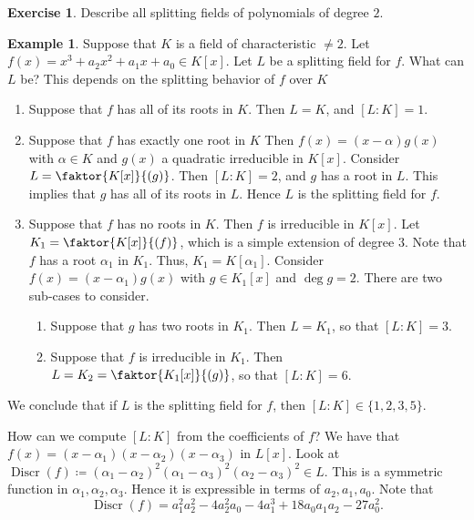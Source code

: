 \documentclass[10pt,letterpaper,cm]{nupset}
\theoremstyle{definition}
\newtheorem{exmp}[definition]{Example}
\theoremstyle{theorem}
\newtheorem{exercise}[definition]{Exercise}
\theoremstyle{remark}
\newcommand{\1}{\mathbf{1}}
\newcommand{\0}{\vec 0}
\DeclareMathOperator{\disc}{Discr}
\begin{document}
\begin{exercise}
Describe all splitting fields of polynomials of degree $2$.
\end{exercise}

\begin{exmp} 
Suppose that $K$ is a field of characteristic $\ne 2$. Let $f(x) = x^3 + a_2x^2 + a_1x + a_0 \in K[x]$. Let $L$ be a splitting field for $f$. What can $L$ be? This depends on the splitting behavior of $f$ over $K$
\begin{enumerate}[label=(\Alph*)]
\item Suppose that $f$ has all of its roots in $K$. Then $L = K$, and $[L:K]=1$.
\item Suppose that $f$ has exactly one root in $K$ Then $f(x) = (x-\alpha)g(x)$ with $\alpha \in K$ and $g(x)$ a quadratic irreducible in $K[x]$. Consider $L = \faktor{K[x]}{(g)}$. Then $[L: K]=2$, and $g$ has a root in $L$. This implies that $g$ has all of its roots in $L$. Hence $L$ is the splitting field for $f$. 
\item Suppose that $f$ has no roots in $K$. Then $f$ is irreducible in $K[x]$. Let $K_1 = \faktor{K[x]}{(f)}$, which is a simple extension of degree $3$. Note that $f$ has a root $\alpha_1$ in $K_1$. Thus, $K_1 = K[\alpha_1]$. Consider $f(x) = (x -\alpha_1)g(x)$ with $g \in K_1[x]$ and $\deg{g} =2$. There are two sub-cases to consider.
\begin{enumerate}
\item Suppose that $g$ has two roots in $K_1$. Then $L= K_1$, so that $[L:K] =3$.
\item Suppose that $f$ is irreducible in $K_1$. Then $L= K_2 = \faktor{K_1[x]}{(g)}$, so that $[L:K] =6$.
\end{enumerate}
\end{enumerate}
We conclude that if $L$ is the splitting field for $f$, then $[L:K] \in \{1, 2, 3, 5\}$.

\medskip


How can we compute $[L:K]$ from the coefficients of $f$?
We have that $f(x) = (x- \alpha_1)(x-\alpha_2)(x-\alpha_3)$ in $L[x]$. Look at $\disc(f)\coloneqq  (\alpha_1 - \alpha_2)^2(\alpha_1 - \alpha_3)^2(\alpha_2 - \alpha_3)^2 \in L$. This is a symmetric function in $\alpha_1, \alpha_2, \alpha_3$. Hence it is expressible in terms of $a_2, a_1, a_0$. Note that $$\disc(f) = a_1^2a_2^2 -4a_2^2a_0 -4a_1^3 + 18 a_0a_1a_2 - 27a_0^2.$$


\end{exmp}
\end{document}
